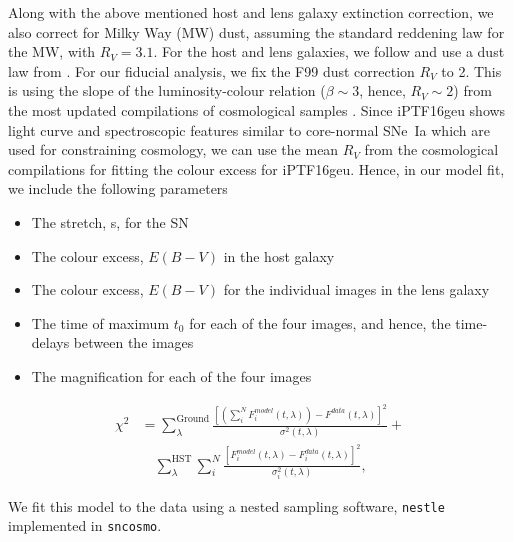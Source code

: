 \documentclass[a4paper,fleqn,usenatbib]{mnras}
\begin{document}
Along with the above mentioned host and lens galaxy extinction correction, we also correct for Milky Way (MW) dust, assuming the standard  reddening law \citep[][hereafter, CCM89]{1989ApJ...345..245C} for the MW, with $R_V = 3.1$. For the host and lens galaxies, we follow \citet{Amanullah:2015bj} and use a dust law from \citet[][hereafter, F99]{Fitzpatrick:1999dx}. For our fiducial analysis, we fix the F99 dust correction $R_V$ to 2. 
This is using the slope of the luminosity-colour relation ($\beta \sim 3$, hence, $R_V \sim 2$) from the most updated compilations of cosmological samples \citep[see;][]{2018ApJ...859..101S,2018arXiv181102374D}. Since iPTF16geu shows light curve and spectroscopic features similar to core-normal SNe~Ia \citep{2018MNRAS.473.4257C} which are used for constraining cosmology, we can use the mean $R_V$ from the cosmological compilations for fitting the colour excess for iPTF16geu. Hence, in our model fit, we include the following parameters 
\begin{itemize}
    \item The stretch, s, for the SN
    \item The colour excess, $E(B-V)$ in the host galaxy
    \item The colour excess, $E(B-V)$ for the individual images in the lens galaxy 
    \item The time of maximum $t_{0}$ for each of the four images, and hence, the time-delays between the images
    \item The magnification for each of the four images
\end{itemize}
\begin{equation}
\label{eq:chi}
\begin{aligned}
\chi ^2 &= \sum_{\lambda}^{\mathrm{Ground}}\frac{\left[\left(\sum_i^{N} F_i^{model}(t,\lambda)\right)-F^{data}(t,\lambda)\right]^2}{\sigma^2(t,\lambda)}+ \\
&\quad \sum_{\lambda}^{\mathrm{HST}}\sum_i^{N}\frac{\left[F_i^{model}(t,\lambda)-F_i^{data}(t,\lambda)\right]^2}{\sigma_i^2(t,\lambda)},
\end{aligned}
\end{equation}

We fit this model to the data using a nested sampling software, \texttt{nestle} implemented in \texttt{sncosmo}. 
\end{document}
